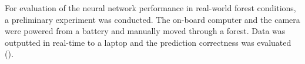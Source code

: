 For evaluation of the neural network performance in real-world forest conditions, a preliminary experiment was conducted. The on-board computer and the camera were powered from  a battery and manually moved through a forest. Data was outputted in real-time to a laptop and the prediction correctness was evaluated ().


\begin{figure}[!h]
  \begin{minipage}{.5\linewidth}
  \centering
  \end{minipage}
  \begin{minipage}{.5\linewidth}
  \centering	
  

  \end{minipage}
  

\end{figure}
